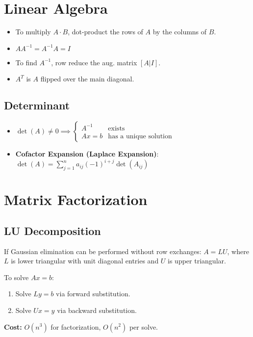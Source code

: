 \documentclass[8pt, letterpaper]{extarticle}
\begin{document}
\begin{multicols*}{3}
  \section{Linear Algebra}
  \begin{itemize}
    \item To multiply $A \cdot B$, dot-product the rows of $A$ by the columns of $B$.
    \item $A A^{-1} = A^{-1} A = I$
    \item To find $A^{-1}$, row reduce the aug. matrix $[A | I]$.
    \item $A^T$ is $A$ flipped over the main diagonal.
  \end{itemize}

  \subsection{Determinant}
  \begin{itemize}
    \item $\det(A) \neq 0 \implies \begin{cases}
        A^{-1} & \text{exists} \\
        Ax = b & \text{has a unique solution}
      \end{cases}$
    \item \textbf{Cofactor Expansion (Laplace Expansion)}:  
      $\det(A) = \sum_{j=1}^{n} a_{ij} (-1)^{i+j} \det(A_{ij})$

      
  \end{itemize}

  \section{Matrix Factorization}
  \subsection{LU Decomposition}
  If Gaussian elimination can be performed without row exchanges:
  $A = LU$,
  where $ L $ is lower triangular with unit diagonal entries and $ U $ is upper triangular.

  To solve $ Ax = b $:
  \begin{enumerate}
    \item Solve $ Ly = b $ via forward substitution.
    \item Solve $ Ux = y $ via backward substitution.
  \end{enumerate}
  \textbf{Cost:} $ O(n^3) $ for factorization, $ O(n^2) $ per solve.


\end{multicols*}
\end{document}
